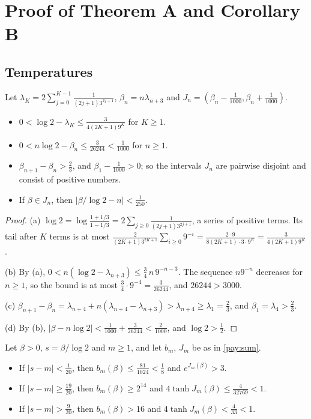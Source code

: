 \section{Proof of Theorem A and Corollary B}\label{sec:proof}

\subsection{Temperatures}

\begin{lemma}\label{prf:windows}
Let $\lambda_K=2\sum_{j=0}^{K-1}\frac1{(2j+1)3^{2j+1}}$, $\beta_n=n\lambda_{n+3}$ and $J_n=(\beta_n-\frac1{1000},\beta_n+\frac1{1000})$.
\begin{itemize}
\item[(a)] $0<\log2-\lambda_K\le\frac{3}{4(2K+1)9^K}$ for $K\ge1$.
\item[(b)] $0<n\log2-\beta_n\le\frac{3}{26244}<\frac1{1000}$ for $n\ge1$.
\item[(c)] $\beta_{n+1}-\beta_n>\frac23$, and $\beta_1-\frac1{1000}>0$; so the intervals $J_n$ are pairwise disjoint and consist of positive numbers.
\item[(d)] If $\beta\in J_n$, then $|\beta/\log2-n|<\frac1{250}$.
\end{itemize}
\end{lemma}

\begin{proof}
(a) $\log2=\log\frac{1+1/3}{1-1/3}=2\sum_{j\ge0}\frac{1}{(2j+1)3^{2j+1}}$, a series of positive terms. Its tail after $K$ terms is at most $\frac{2}{(2K+1)3^{2K+1}}\sum_{i\ge0}9^{-i}=\frac{2\cdot9}{8(2K+1)\cdot3\cdot9^K}=\frac{3}{4(2K+1)9^K}$.

(b) By (a), $0<n(\log2-\lambda_{n+3})\le\frac34\,n\,9^{-n-3}$. The sequence $n9^{-n}$ decreases for $n\ge1$, so the bound is at most $\frac34\cdot9^{-4}=\frac{3}{26244}$, and $26244>3000$.

(c) $\beta_{n+1}-\beta_n=\lambda_{n+4}+n(\lambda_{n+4}-\lambda_{n+3})>\lambda_{n+4}\ge\lambda_1=\frac23$, and $\beta_1=\lambda_4>\frac23$.

(d) By (b), $|\beta-n\log2|<\frac1{1000}+\frac{3}{26244}<\frac2{1000}$, and $\log2>\frac12$.
\end{proof}

\begin{lemma}\label{prf:thermal}
Let $\beta>0$, $s=\beta/\log2$ and $m\ge1$, and let $b_m$, $J_m$ be as in \cref{pay:sum}.
\begin{itemize}
\item[(a)] If $|s-m|<\frac1{20}$, then $b_m(\beta)\le\frac{81}{1024}<\frac18$ and $e^{J_m(\beta)}>3$.
\item[(b)] If $|s-m|\ge\frac{19}{20}$, then $b_m(\beta)\ge2^{14}$ and $4\tanh J_m(\beta)\le\frac{4}{32769}<1$.
\item[(c)] If $|s-m|>\frac{9}{20}$, then $b_m(\beta)>16$ and $4\tanh J_m(\beta)<\frac4{33}<1$.
\end{itemize}
\end{lemma}

